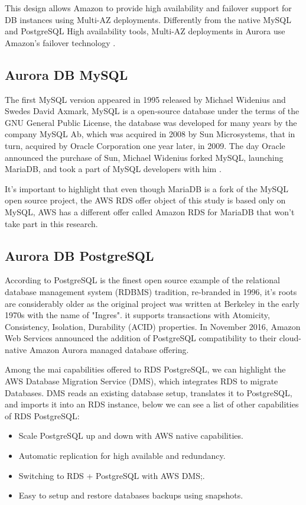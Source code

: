 \documentclass{article}
\begin{document}
This design allows Amazon to provide high availability and failover support for DB instances using Multi-AZ deployments. Differently from the native MySQL and PostgreSQL High availability tools, Multi-AZ deployments in Aurora use Amazon's failover technology \cite{awsha}.

\subsection{Aurora DB MySQL}
The first MySQL version appeared in 1995 released by Michael Widenius and Swedes David Axmark, MySQL is a open-source database under the terms of the GNU General Public License, the database was developed for many years by the company	MySQL Ab, which was acquired in 2008 by Sun	Microsystems, that in turn,	acquired by	Oracle	Corporation one year later,	in	2009. The day Oracle announced the purchase of Sun, Michael Widenius forked MySQL, launching MariaDB, and took a part of MySQL developers with him \cite{bartholomew2012mariadb}.

It's important to highlight that even though MariaDB is a fork of the MySQL open source project, the AWS RDS offer object of this study is based only on MySQL, AWS has a different offer called Amazon RDS for MariaDB that won't take part in this research. 

\subsection{Aurora DB PostgreSQL}

According to \cite{perkins2018seven} PostgreSQL is the finest open source example of the relational database management system (RDBMS) tradition, re-branded in 1996, it's roots are considerably older as the original project was written at Berkeley in the early 1970s with the name of "Ingres". it supports transactions with Atomicity, Consistency, Isolation, Durability (ACID) properties. In November 2016, Amazon Web Services announced the addition of PostgreSQL compatibility to their cloud-native Amazon Aurora managed database offering. 

Among the mai capabilities offered to RDS PostgreSQL, we can highlight the AWS Database Migration Service (DMS), which integrates RDS to migrate Databases. DMS reads an existing database setup, translates it to PostgreSQL, and imports it into an RDS instance, below we can see a list of other capabilities of RDS PostgreSQL: 

\begin{itemize}
    \item Scale PostgreSQL up and down with AWS native capabilities. 
    \item Automatic replication for high available and redundancy. 
    \item Switching to RDS + PostgreSQL with AWS DMS;. 
    \item Easy to setup and restore databases backups using snapshots. 
\end{itemize}
\end{document}
